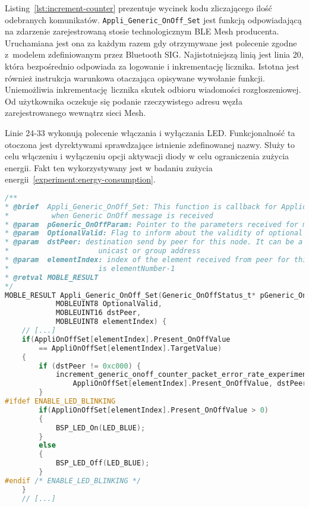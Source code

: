 Listing~\ref{lst:increment-counter} prezentuje wycinek kodu zliczającego ilość odebranych komunikatów. 
\texttt{Appli\_Generic\_OnOff\_Set} jest funkcją odpowiadającą na zdarzenie zarejestrowaną stosie technologicznym
BLE Mesh producenta. Uruchamiana jest ona za każdym razem gdy otrzymywane jest polecenie zgodne
z~modelem zdefiniowanym przez Bluetooth SIG. Najistotniejszą linią jest linia 20, która bezpośrednio
odpowiada za logowanie i inkrementację licznika. Istotna jest również instrukcja warunkowa
otaczająca opisywane wywołanie funkcji. Uniemożliwia inkrementację licznika skutek odbioru
wiadomości rozgłoszeniowej. Od użytkownika oczekuje się podanie rzeczywistego adresu węzła
zarejestrowanego wewnątrz sieci Mesh.

Linie 24-33 wykonują polecenie włączania i wyłączania \gls{LED}. Funkcjonalność ta otoczona jest
dyrektywami sprawdzające istnienie zdefinowanej nazwy. Służy to celu włączeniu i wyłączeniu
opcji aktywacji diody w celu ograniczenia zużycia energii. Fakt ten wykorzystywany jest
w badaniu zużycia energii~\ref{experiment:energy-consumption}.


\begin{lstlisting}[language=C,
    caption={Inkrementacja licznika realizowana jest poprzez dostosowanie funkcji odpowiadającej na zdarzenie},
    label={lst:increment-counter}]
/**
* @brief  Appli_Generic_OnOff_Set: This function is callback for Application
*          when Generic OnOff message is received
* @param  pGeneric_OnOffParam: Pointer to the parameters received for message
* @param  OptionalValid: Flag to inform about the validity of optional parameters 
* @param  dstPeer: destination send by peer for this node. It can be a
*                     unicast or group address 
* @param  elementIndex: index of the element received from peer for this node which
*                     is elementNumber-1
* @retval MOBLE_RESULT
*/ 
MOBLE_RESULT Appli_Generic_OnOff_Set(Generic_OnOffStatus_t* pGeneric_OnOffParam, 
			MOBLEUINT8 OptionalValid,
			MOBLEUINT16 dstPeer,
			MOBLEUINT8 elementIndex) {
	// [...]
	if(AppliOnOffSet[elementIndex].Present_OnOffValue 
		== AppliOnOffSet[elementIndex].TargetValue)
	{
		if (dstPeer != 0xc000) {
			increment_generic_onoff_counter_packet_error_rate_experiment(
				AppliOnOffSet[elementIndex].Present_OnOffValue, dstPeer);
		}
#ifdef ENABLE_LED_BLINKING
		if(AppliOnOffSet[elementIndex].Present_OnOffValue > 0)
		{
			BSP_LED_On(LED_BLUE);
		}
		else
		{
			BSP_LED_Off(LED_BLUE);
		}
#endif /* ENABLE_LED_BLINKING */
	}
	// [...]
\end{lstlisting}


